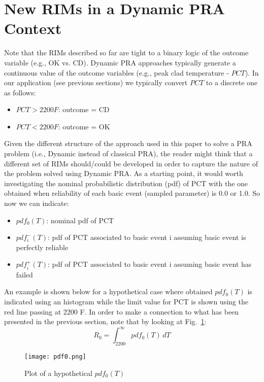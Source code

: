 \section{New RIMs in a Dynamic PRA Context}
\label{sec:newRIM}

Note that the RIMs described so far are tight to a binary logic of the outcome 
variable (e.g., OK vs. CD). Dynamic PRA approaches typically generate a continuous 
value of the outcome variables (e.g., peak clad temperature - $PCT$). 
In our application (see previous sections) we typically convert $PCT$ to a discrete 
one as follows:
\begin{itemize}
  \item $PCT>2200 F$: outcome = CD
  \item $PCT<2200 F$: outcome = OK
\end{itemize}
  
Given the different structure of the approach used in this paper to solve a PRA 
problem (i.e., Dynamic instead of classical PRA), the reader might think that a different 
set of RIMs should/could be developed in order to capture the nature of the problem 
solved using Dynamic PRA.
As a starting point, it would worth investigating the nominal probabilistic distribution 
(pdf) of PCT with the one obtained when reliability of each basic event (sampled parameter) 
is 0.0 or 1.0. So now we can indicate:
\begin{itemize}
  \item $pdf_0 (T)$: nominal pdf of PCT
  \item $pdf_i^-(T)$: pdf of PCT associated to basic event i assuming basic event is perfectly 
        reliable
  \item $pdf_i^+(T)$: pdf of PCT associated to basic event i assuming basic event has failed
\end{itemize}

An example is shown below for a hypothetical case where obtained $pdf_0(T)$ is indicated 
using an histogram while the limit value for PCT is shown using the red line passing at 2200 F.
In order to make a connection to what has been presented in the previous section, note that by 
looking at Fig.~\ref{fig:pdf0}:
\begin{equation}
  R_0 = \int_{2200}^\infty \! pdf_0(T) \, dT
  \label{eq:R0}
\end{equation}

\begin{figure}
    \centering
    \centerline{\texttt{[image: pdf0.png]}}
    \caption{Plot of a hypothetical $pdf_0(T)$}
    \label{fig:pdf0}
\end{figure}

